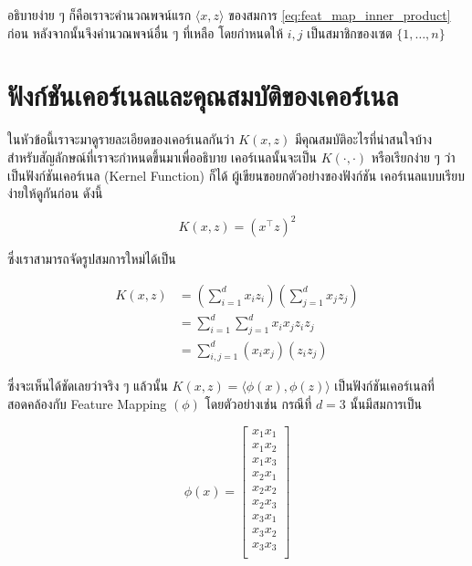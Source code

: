 \noindent อธิบายง่าย ๆ ก็คือเราจะคำนวณพจน์แรก $\langle x,z \rangle$ ของสมการ \eqref{eq:feat_map_inner_product} ก่อน
หลังจากนั้นจึงคำนวณพจน์อื่น ๆ ที่เหลือ โดยกำหนดให้ $i,j$ เป็นสมาชิกของเซต $\{1, \dots, n\}$

\section{ฟังก์ชันเคอร์เนลและคุณสมบัติของเคอร์เนล}
\label{sec:func_kernel}

ในหัวข้อนี้เราจะมาดูรายละเอียดของเคอร์เนลกันว่า $K(x,z)$ มีคุณสมบัติอะไรที่น่าสนใจบ้าง สำหรับสัญลักษณ์ที่เราจะกำหนดขึ้นมาเพื่ออธิบาย%
เคอร์เนลนั้นจะเป็น $K(\cdot,\cdot)$ หรือเรียกง่าย ๆ ว่าเป็นฟังก์ชันเคอร์เนล (Kernel Function) ก็ได้ ผู้เขียนขอยกตัวอย่างของฟังก์ชัน%
เคอร์เนลแบบเรียบง่ายให้ดูกันก่อน ดังนี้

\begin{equation}
    K(x,z) = (x^{\top} z)^{2}
\end{equation}

\noindent ซึ่งเราสามารถจัดรูปสมการใหม่ได้เป็น

\begin{align}
    K(x,z) & = \left( \sum_{i=1}^d x_i z_i \right) \left( \sum_{j=1}^d x_j z_j \right) \\
           & = \sum_{i=1}^d \sum_{j=1}^d x_i x_j z_i z_j                               \\
           & = \sum_{i,j=1}^d (x_i x_j)(z_i z_j)
\end{align}

\noindent ซึ่งจะเห็นได้ชัดเลยว่าจริง ๆ แล้วนั้น $K(x,z) = \langle\phi(x),\phi(z)\rangle$ เป็นฟังก์ชันเคอร์เนลที่สอดคล้องกับ Feature
Mapping $(\phi)$ โดยตัวอย่างเช่น กรณีที่ $d = 3$ นั้นมีสมการเป็น

\begin{equation}\label{eq:feature_map_ex1}
    \phi(x) =
    \begin{bmatrix}
        x_1 x_1 \\
        x_1 x_2 \\
        x_1 x_3 \\
        x_2 x_1 \\
        x_2 x_2 \\
        x_2 x_3 \\
        x_3 x_1 \\
        x_3 x_2 \\
        x_3 x_3 \\
    \end{bmatrix}
\end{equation}

